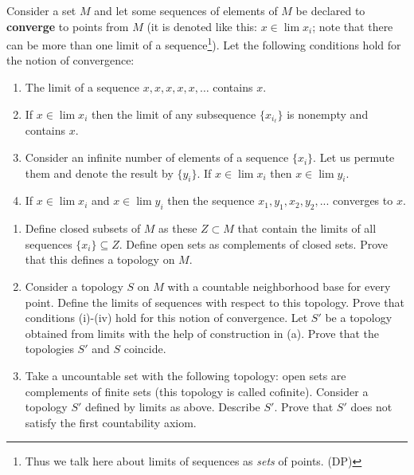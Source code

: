 \documentclass[12pt]{article}
\begin{document}
\begin{zadacha}[*]
Consider a set $M$ and let some sequences of elements of $M$ be
declared to {\bf converge} to points from $M$ (it is denoted like this:
$x\in \lim x_i$; note that there can be more than one limit of a
sequence\footnote{Thus we talk here 
about limits of sequences as {\em sets} of points. (DP)}). 
Let the following conditions hold for the notion of
convergence: 
\begin{enumerate}
\renewcommand{\labelenumi}{(\roman{enumi})}

\item The limit of a sequence $x, x, x,x,x, \dots $ contains $x$.

\item If $x\in \lim x_i$ then the limit of any subsequence
$\{x_{i_\ell}\}$ is nonempty and contains $x$.

\item Consider an infinite number of elements of a sequence $\{x_i\}$.
  Let us permute them and denote the result by $\{ y_i\}$. If
  $x\in \lim x_i$ then $x\in \lim y_i$.

\item If $x\in\lim x_i$ and $x\in\lim y_i$ then the sequence $x_1, y_1,
  x_2, y_2, ...$ converges to $x$.
\end{enumerate}
\begin{enumerate}
\item Define closed subsets of $M$ as these 
$Z\subset M$ that contain the limits of all sequences
$\{x_i\}\subseteq Z$.  Define open sets as complements of closed sets.
Prove that this defines a topology on $M$.

\item Consider a topology $S$ on $M$ with a countable
  neighborhood base for every point. Define the limits of sequences
  with respect to this topology. Prove that conditions (i)-(iv) hold
  for this notion of convergence. Let $S'$ be a topology obtained
  from limits with the help of construction in (a). Prove that the
  topologies $S'$ and $S$ coincide.

\item Take a uncountable set with the following topology: open sets
  are complements of finite sets (this topology is called cofinite).
  Consider a topology $S'$ defined by limits as above. Describe $S'$.
  Prove that $S'$ does not satisfy the first countability axiom.

\end{enumerate}
\end{zadacha}
\end{document}

